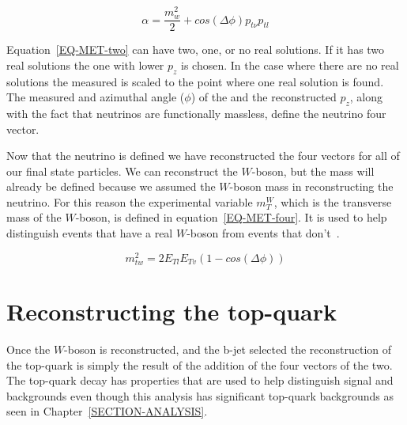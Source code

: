 \begin{equation}
\label{EQ-MET-three}
\alpha = \frac{m_w^2}{2}+cos(\Delta \phi) p_{t\nu} p_{tl}
\end{equation}

Equation~\ref{EQ-MET-two} can have two, one, or no real solutions. If it has two real solutions the one with lower $p_z$ is chosen. In the case where there are no real solutions the measured \met is scaled to the point where one real solution is found. The measured \met and azimuthal angle ($\phi$) of the \met and the reconstructed $p_z$, along with the fact that neutrinos are functionally massless, define the neutrino four vector. 

Now that the neutrino is defined we have reconstructed the four vectors for all of our final state particles. We can reconstruct the $W$-boson, but the mass will already be defined because we assumed the $W$-boson mass in reconstructing the neutrino. For this reason the experimental variable $m_{T}^W$, which is the transverse mass of the $W$-boson, is defined in equation~\ref{EQ-MET-four}. It is used to help distinguish events that have a real $W$-boson from events that don't~\cite{MET}. 

\begin{equation}
\label{EQ-MET-four}
m_{tw}^2 = 2 E_{Tl} E_{Tv} (1-cos(\Delta \phi))
\end{equation}


\section{Reconstructing the top-quark}
\label{SECTION-OBJ-TOP}

Once the $W$-boson is reconstructed, and the b-jet selected the reconstruction of the top-quark is simply the result of the addition of the four vectors of the two. The top-quark decay has properties that are used to help distinguish signal and backgrounds even though this analysis has significant top-quark backgrounds as seen in Chapter~\ref{SECTION-ANALYSIS}. 

